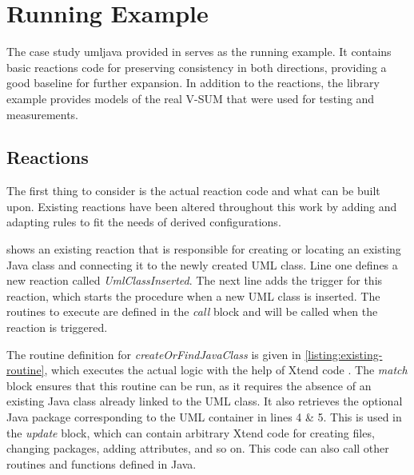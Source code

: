 \chapter{Running Example}
\label{ch:RunningExample}

The case study umljava provided in \cite{umljavacasestudy} serves as the running example.
It contains basic reactions code for preserving consistency in both directions, providing a good baseline for further expansion.
In addition to the reactions, the library example provides models of the real V-SUM that were used for testing and measurements.

\section{Reactions}
\label{sec:RunningExample:Reactions}

The first thing to consider is the actual reaction code and what can be built upon.
Existing reactions have been altered throughout this work by adding and adapting rules to fit the needs of derived configurations.



 shows an existing reaction that is responsible for creating or locating an existing Java class and connecting it to the newly created UML class.
Line one defines a new reaction called \textit{UmlClassInserted}.
The next line adds the trigger for this reaction, which starts the procedure when a new UML class is inserted.
The routines to execute are defined in the \textit{call} block and will be called when the reaction is triggered.



The routine definition for \textit{createOrFindJavaClass} is given in \autoref{listing:existing-routine}, which executes the actual logic with the help of Xtend code \cite{KLARE2021110815}.
The \textit{match} block ensures that this routine can be run, as it requires the absence of an existing Java class already linked to the UML class.
It also retrieves the optional Java package corresponding to the UML container in lines 4 \& 5.
This is used in the \textit{update} block, which can contain arbitrary Xtend code for creating files, changing packages, adding attributes, and so on.
This code can also call other routines and functions defined in Java.


